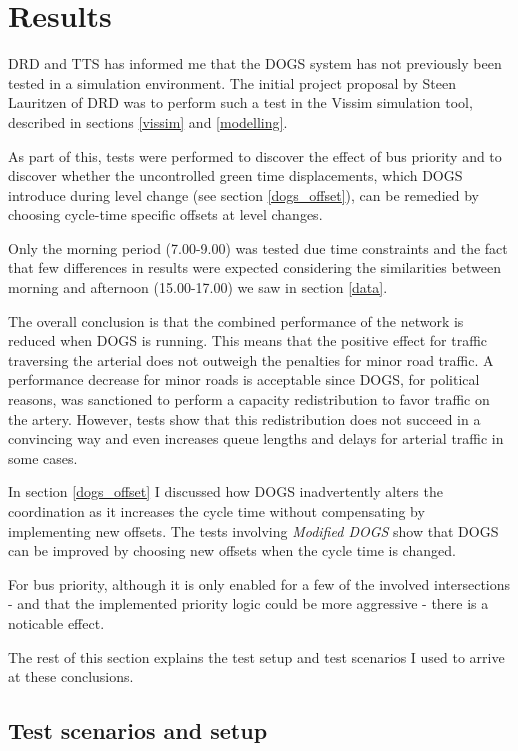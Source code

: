 \section{Results}
\label{test}
DRD and TTS has informed me that the DOGS system has not previously been tested in a simulation environment. The initial project proposal by Steen Lauritzen of DRD was to perform such a test in the Vissim simulation tool, described in sections \ref{vissim} and \ref{modelling}.

As part of this, tests were performed to discover the effect of bus priority and to discover whether the uncontrolled green time displacements, which DOGS introduce during level change (see section \ref{dogs_offset}), can be remedied by choosing cycle-time specific offsets at level changes.

Only the morning period (7.00-9.00) was tested due time constraints and the fact that few differences in results were expected considering the similarities between morning and afternoon (15.00-17.00) we saw in section \ref{data}.
 
The overall conclusion is that the combined performance of the network is reduced when DOGS is running. This means that the positive effect for traffic traversing the arterial does not outweigh the penalties for minor road traffic. 
A performance decrease for minor roads is acceptable since DOGS, for political reasons, was sanctioned to perform a capacity redistribution to favor traffic on the artery. However, tests show that this redistribution does not succeed in a convincing way and even increases queue lengths and delays for arterial traffic in some cases.

In section \ref{dogs_offset} I discussed how DOGS inadvertently alters the coordination as it increases the cycle time without compensating by implementing new offsets. The tests involving \textit{Modified DOGS} show that DOGS can be improved by choosing new offsets when the cycle time is changed.

For bus priority, although it is only enabled for a few of the involved intersections - and that the implemented priority logic could be more aggressive - there is a noticable effect.

The rest of this section explains the test setup and test scenarios I used to arrive at these conclusions. 

\subsection{Test scenarios and setup}

